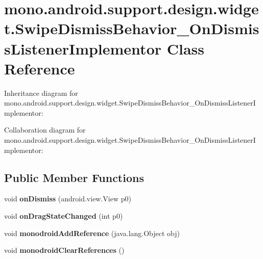 \hypertarget{classmono_1_1android_1_1support_1_1design_1_1widget_1_1_swipe_dismiss_behavior___on_dismiss_listener_implementor}{}\section{mono.\+android.\+support.\+design.\+widget.\+Swipe\+Dismiss\+Behavior\+\_\+\+On\+Dismiss\+Listener\+Implementor Class Reference}
\label{classmono_1_1android_1_1support_1_1design_1_1widget_1_1_swipe_dismiss_behavior___on_dismiss_listener_implementor}


Inheritance diagram for mono.\+android.\+support.\+design.\+widget.\+Swipe\+Dismiss\+Behavior\+\_\+\+On\+Dismiss\+Listener\+Implementor\+:


Collaboration diagram for mono.\+android.\+support.\+design.\+widget.\+Swipe\+Dismiss\+Behavior\+\_\+\+On\+Dismiss\+Listener\+Implementor\+:
\subsection*{Public Member Functions}
\begin{DoxyCompactItemize}
\item 
\mbox{\label{classmono_1_1android_1_1support_1_1design_1_1widget_1_1_swipe_dismiss_behavior___on_dismiss_listener_implementor_a02089f50a204509626734dd1c055ab1a}} 
void {\bfseries on\+Dismiss} (android.\+view.\+View p0)
\item 
\mbox{\label{classmono_1_1android_1_1support_1_1design_1_1widget_1_1_swipe_dismiss_behavior___on_dismiss_listener_implementor_a6aa730cbfa98df31e7c6b6ec5ed7fe80}} 
void {\bfseries on\+Drag\+State\+Changed} (int p0)
\item 
\mbox{\label{classmono_1_1android_1_1support_1_1design_1_1widget_1_1_swipe_dismiss_behavior___on_dismiss_listener_implementor_ae605fb05b54f87719255cdd580d427aa}} 
void {\bfseries monodroid\+Add\+Reference} (java.\+lang.\+Object obj)
\item 
\mbox{\label{classmono_1_1android_1_1support_1_1design_1_1widget_1_1_swipe_dismiss_behavior___on_dismiss_listener_implementor_ac75831ca6f427928cf49cef6c842e8d6}} 
void {\bfseries monodroid\+Clear\+References} ()
\end{DoxyCompactItemize}
